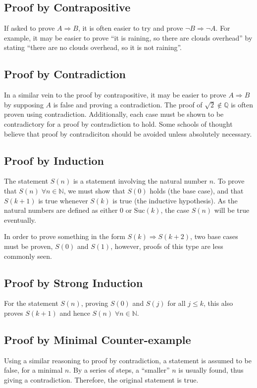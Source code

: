 \documentclass[10pt]{article}
\begin{document}
\subsection{Proof by Contrapositive}
If asked to prove $A\Rightarrow B$, it is often easier to try and prove $\lnot B\Rightarrow\lnot A$.  For example, it may be easier to prove ``it is raining, so there are clouds overhead'' by stating ``there are no clouds overhead, so it is not raining''.
\subsection{Proof by Contradiction}
In a similar vein to the proof by contrapositive, it may be easier to prove $A\Rightarrow B$ by supposing $A$ is false and proving a contradiction.  The 
proof of $\sqrt 2\not\in\mathbb Q$ is often proven using contradiction.  Additionally, each case must be shown to be contradictory for a proof by contradiction to hold.  Some schools of thought believe that proof by contradiciton should be avoided unless absolutely necessary.
\subsection{Proof by Induction}
The statement $S(n)$ is a statement involving the natural number $n$.  To prove that $S(n)\;\forall n\in\mathbb N$, we must show that $S(0)$ holds (the base case), and that $S(k+1)$ is true whenever $S(k)$ is true (the inductive hypothesis).  As the natural numbers are defined as either $0$ or $\mathrm{Suc}(k)$, the case $S(n)$ will be true eventually.

In order to prove something in the form $S(k)\Rightarrow S(k+2)$, two base cases must be proven, $S(0)$ and $S(1)$, however, proofs of this type are less commonly seen.
\subsection{Proof by Strong Induction}
For the statement $S(n)$, proving $S(0)$ and $S(j)$ for all $j\le k$, this also proves $S(k+1)$ and hence $S(n)\;\forall n\in\mathbb N$.
\subsection{Proof by Minimal Counter-example}
Using a similar reasoning to proof by contradiction, a statement is assumed to be false, for a minimal $n$.  By a series of steps, a ``smaller'' $n$ is usually found, thus giving a contradiction.  Therefore, the original statement is true.
\end{document}
